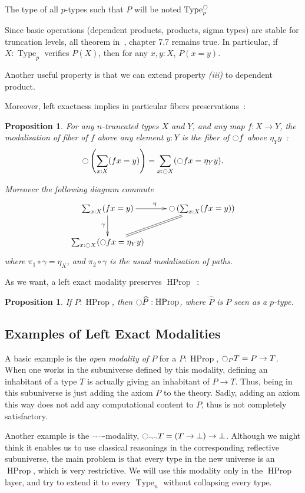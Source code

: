 \documentclass[conference]{IEEEtran}
\newtheorem{prop}[thm]{Proposition}
\DeclareMathOperator{\Type}{Type}
\DeclareMathOperator{\HProp}{HProp}
\newcommand{\modal}{\ensuremath{\ocircle}}
\begin{document}
The type of all $p$-types such that $P$ will be noted $\Type^\modal_p$

Since basic operations (dependent products, products, sigma types) are
stable for truncation levels, all theorem in~\cite{hottbook}, chapter
7.7 remains true.
In particular, if $X:\Type_p$ verifies $P(X)$, then for any $x,y:X$, $P(x=y)$.

Another useful property is that we can extend property {\it (iii)} to
dependent product.

Moreover, left exactness implies in particular fibers preservations~:
\begin{prop}
For any $n$-truncated types $X$ and $Y$,
and any map $f:X \to Y$, the modalisation of fiber of $f$ above any element $y:Y$
is the fiber of $\modal f$ above $\eta_Y y$~:
$$\modal \left(\sum_{x:X}  (f x = y)\right) = \sum_{x:\modal X} (\modal f x = \eta_Y y).$$

Moreover the following diagram commute
$$\xymatrix{
  \sum_{x:X} (f x = y) \ar[r]^\eta \ar[d]_\gamma & \modal \left(\sum_{x:X}  (f x = y)\right) \ar@{=}[dl]\\
  \sum_{x:\modal X} (\modal f x = \eta_Y y) &
}$$
where $\pi_1 \circ \gamma = \eta_X$, and $\pi_2 \circ \gamma$ is the
usual modalisation of paths.
\end{prop}


As we want, a left exact modality preserves $\HProp$~:
\begin{prop}
  If $P:\HProp$, then $\modal \widehat P : \HProp$, where $\widehat P$
  is $P$ seen as a $p$-type.
\end{prop}

\subsection{Examples of Left Exact Modalities}

A basic example is the {\em open modality of $P$} for a $P:\HProp$,
$\modal_P T = P \to T$.  When one works in the subuniverse defined by
this modality, defining an inhabitant of a type $T$ is actually giving
an inhabitant of $P \to T$. Thus, being in this subuniverse is just
adding the axiom $P$ to the theory. Sadly, adding an axiom this way
does not add any computational content to $P$, thus is not completely
satisfactory.

Another example is the $\lnot\lnot$-modality, $\modal_{\lnot\lnot} T = (T
\to \bot) \to \bot$. Although we might think it enables us to use
classical reasonings in the corresponding reflective subuniverse, the
main problem is that every type in the new universe is an $\HProp$,
which is very restrictive. 
We will use this modality only in the $\HProp$ layer, and try to
extend it to every $\Type_n$ without collapsing every type.
\end{document}
